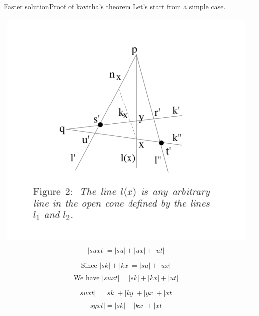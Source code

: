 \documentclass{beamer}
\begin{document}
\begin{frame}{Faster solution}{Proof of kavitha's theorem}
    Let's start from a simple case. \\
    \begin{tabular}{c c}
        \begin{minipage}{0.4\textwidth}
            \includegraphics[width=\linewidth]{simple_proof.png}
        \end{minipage}  
        &  
        \begin{minipage}{0.5\textwidth}
            $|syxt| = |sy| + |yx| + |xt| = |sk| + |ky| + |yx| + |xt| $ \\
            $|suxt| = |su| + |ux| + |ut| $ \\ 
            \\
            Since $|sk| + |kx| = |su| + |ux|$ \\
            We have $|suxt|  = |sk| + |kx| + |ut| $ \\
            \\ 
            $|suxt| = |sk| + |ky| + |yx| + |xt| $ \\
            $|syxt| = |sk| + |kx| + |xt| $
        \end{minipage} 
    \end{tabular}
\end{frame}
\end{document}
